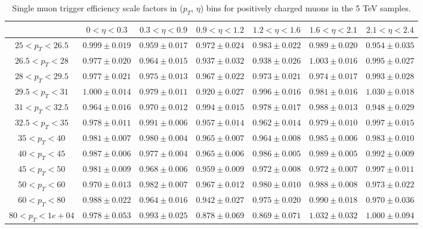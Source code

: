 \begin{table}
\begin{center}
{\begin{tabular}{ccccccc}
\hline
& $0< \eta<0.3$ & $0.3< \eta<0.9$ & $0.9< \eta<1.2$ & $1.2< \eta<1.6$ & $1.6< \eta<2.1$ & $2.1< \eta<2.4$ \\
\hline \hline
$25<p_{T}<26.5$ & $0.999 \pm 0.019$ & $0.959 \pm 0.017$ & $0.972 \pm 0.024$ & $0.983 \pm 0.022$ & $0.989 \pm 0.020$ & $0.954 \pm 0.035$  \\
$26.5<p_{T}<28$ & $0.977 \pm 0.020$ & $0.964 \pm 0.015$ & $0.937 \pm 0.032$ & $0.938 \pm 0.026$ & $1.003 \pm 0.016$ & $0.995 \pm 0.027$  \\
$28<p_{T}<29.5$ & $0.977 \pm 0.021$ & $0.975 \pm 0.013$ & $0.967 \pm 0.022$ & $0.973 \pm 0.021$ & $0.974 \pm 0.017$ & $0.993 \pm 0.028$  \\
$29.5<p_{T}<31$ & $1.000 \pm 0.014$ & $0.979 \pm 0.011$ & $0.920 \pm 0.027$ & $0.996 \pm 0.016$ & $0.981 \pm 0.016$ & $1.030 \pm 0.018$  \\
$31<p_{T}<32.5$ & $0.964 \pm 0.016$ & $0.970 \pm 0.012$ & $0.994 \pm 0.015$ & $0.978 \pm 0.017$ & $0.988 \pm 0.013$ & $0.948 \pm 0.029$  \\
$32.5<p_{T}<35$ & $0.978 \pm 0.011$ & $0.991 \pm 0.006$ & $0.957 \pm 0.014$ & $0.962 \pm 0.014$ & $0.979 \pm 0.010$ & $0.997 \pm 0.015$  \\
$35<p_{T}<40$ & $0.981 \pm 0.007$ & $0.980 \pm 0.004$ & $0.965 \pm 0.007$ & $0.964 \pm 0.008$ & $0.985 \pm 0.006$ & $0.983 \pm 0.010$  \\
$40<p_{T}<45$ & $0.987 \pm 0.006$ & $0.977 \pm 0.004$ & $0.965 \pm 0.006$ & $0.986 \pm 0.005$ & $0.989 \pm 0.005$ & $0.992 \pm 0.009$  \\
$45<p_{T}<50$ & $0.981 \pm 0.009$ & $0.968 \pm 0.006$ & $0.959 \pm 0.009$ & $0.972 \pm 0.008$ & $0.972 \pm 0.007$ & $0.997 \pm 0.011$  \\
$50<p_{T}<60$ & $0.970 \pm 0.013$ & $0.982 \pm 0.007$ & $0.967 \pm 0.012$ & $0.980 \pm 0.010$ & $0.988 \pm 0.008$ & $0.973 \pm 0.022$  \\
$60<p_{T}<80$ & $0.988 \pm 0.022$ & $0.964 \pm 0.016$ & $0.942 \pm 0.027$ & $0.975 \pm 0.020$ & $0.990 \pm 0.018$ & $0.970 \pm 0.036$  \\
$80<p_{T}<1e+04$ & $0.978 \pm 0.053$ & $0.993 \pm 0.025$ & $0.878 \pm 0.069$ & $0.869 \pm 0.071$ & $1.032 \pm 0.032$ & $1.000 \pm 0.094$  \\
\hline
\end{tabular}}
\end{center}
\caption{Single muon trigger efficiency scale factors in ($p_T$, $\eta$) bins for positively charged muons in the 5 TeV samples.}
\label{tab:Eff:mu:5TeV:HLT:pos}
\end{table}
